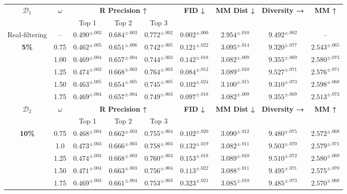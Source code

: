 \documentclass[a4paper,12pt]{article}
\begin{document}
\begin{table}[t]
\centering
\scriptsize
\renewcommand{\arraystretch}{1}
\begin{tabular}{cc|ccc|c|c|c|c}
\toprule
\multirow{2}{*}{\textbf{$\mathcal{D}_1$}}& \multirow{2}{*}{\textbf{$\omega$}} & \multicolumn{3}{c|}{\textbf{R Precision ↑}} & \multirow{2}{*}{\textbf{FID ↓}} & \multirow{2}{*}{\textbf{MM Dist ↓}} & \multirow{2}{*}{\textbf{Diversity →}} & \multirow{2}{*}{\textbf{MM ↑}} \\
& & Top 1 & Top 2 & Top 3 &  &  &  & \\
\midrule
Real-filtering   & -- & $0.490^{\pm.003}$ & $0.684^{\pm.003}$ & $0.772^{\pm.002}$ & $0.002^{\pm.000}$ & $2.954^{\pm.010}$ & $9.492^{\pm.002}$ & -- \\ \midrule
\multirow{5}{*}{\textbf{5\%}}
& 0.75  & $0.462^{\pm.005}$ & $0.651^{\pm.006}$ & $0.742^{\pm.005}$ & $0.121^{\pm.022}$ & $3.095^{\pm.014}$ & $9.320^{\pm.077}$ & $2.543^{\pm.065}$ \\
& 1.00 & $0.469^{\pm.004}$ & $0.657^{\pm.004}$ & $0.744^{\pm.003}$ & $0.142^{\pm.018}$ & $3.082^{\pm.009}$ & $9.355^{\pm.069}$ & $2.580^{\pm.073}$ \\
& 1.25  & $0.474^{\pm.003}$ & $0.668^{\pm.003}$ & $0.764^{\pm.003}$ & $0.084^{\pm.012}$ & $3.089^{\pm.010}$ & $9.527^{\pm.071}$ & $2.576^{\pm.071}$ \\
& 1.50  & $0.463^{\pm.005}$ & $0.654^{\pm.005}$ & $0.745^{\pm.005}$ & $0.102^{\pm.024}$ & $3.100^{\pm.015}$ & $9.310^{\pm.073}$ & $2.598^{\pm.068}$ \\
& 1.75 & $0.469^{\pm.004}$ & $0.657^{\pm.004}$ & $0.749^{\pm.003}$ & $0.097^{\pm.018}$ & $3.082^{\pm.009}$ & $9.355^{\pm.069}$ & $2.513^{\pm.073}$ \\
\midrule

\multirow{2}{*}{\textbf{$\mathcal{D}_2$}}& \multirow{2}{*}{\textbf{$\omega$}} & \multicolumn{3}{c|}{\textbf{R Precision ↑}} & \multirow{2}{*}{\textbf{FID ↓}} & \multirow{2}{*}{\textbf{MM Dist ↓}} & \multirow{2}{*}{\textbf{Diversity →}} & \multirow{2}{*}{\textbf{MM ↑}} \\
& & Top 1 & Top 2 & Top 3 &  &  &  & \\
\midrule

\multirow{5}{*}{\textbf{10\%}} 
& 0.75  & $0.468^{\pm.004}$ & $0.662^{\pm.003}$ & $0.755^{\pm.004}$ & $0.102^{\pm.020}$ & $3.090^{\pm.012}$ & $9.480^{\pm.075}$ & $2.572^{\pm.068}$ \\
& 1.0 & $0.473^{\pm.003}$ & $0.666^{\pm.003}$ & $0.758^{\pm.003}$ & $0.132^{\pm.019}$ & $3.082^{\pm.011}$ & $9.503^{\pm.070}$ & $2.579^{\pm.071}$ \\
& 1.25  & $0.474^{\pm.003}$ & $0.668^{\pm.003}$ & $0.760^{\pm.003}$ & $0.153^{\pm.018}$ & $3.089^{\pm.010}$ & $9.510^{\pm.072}$ & $2.580^{\pm.069}$ \\
& 1.50 & $0.471^{\pm.004}$ & $0.663^{\pm.003}$ & $0.756^{\pm.004}$ & $0.113^{\pm.022}$ & $3.088^{\pm.011}$ & $9.495^{\pm.071}$ & $2.575^{\pm.070}$ \\
& 1.75  & $0.469^{\pm.003}$ & $0.661^{\pm.004}$ & $0.753^{\pm.003}$ & $0.323^{\pm.021}$ & $3.085^{\pm.010}$ & $9.485^{\pm.073}$ & $2.570^{\pm.068}$ \\
\midrule


\end{tabular}
\end{table}
\end{document}
